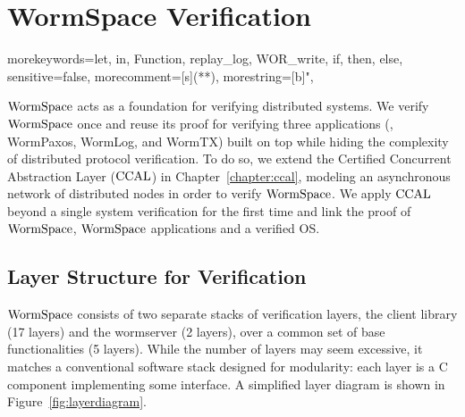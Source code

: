 \section{WormSpace Verification}
\label{sec:formal_verification}

{morekeywords={let, in, Function, replay_log, WOR_write, if, then, else},
sensitive=false,
morecomment=[s]{(*}{*)},
morestring=[b]",
}

$\mathrm{WormSpace}$ acts as a foundation for verifying distributed systems. 
We verify $\mathrm{WormSpace}$ once and reuse its proof for verifying three applications (\ie, WormPaxos, WormLog, and WormTX)
built on top while  hiding the complexity of distributed protocol verification. 	
To do so, we extend the Certified Concurrent Abstraction Layer ($\mathrm{CCAL}$)  in Chapter~\ref{chapter:ccal}, 
modeling an asynchronous network of distributed nodes in order to verify $\mathrm{WormSpace}$. 
We apply $\mathrm{CCAL}$ beyond a single system verification for the first time and link the proof of $\mathrm{WormSpace}$, 
$\mathrm{WormSpace}$ applications and a verified OS. 

\subsection{Layer Structure for Verification}

$\mathrm{WormSpace}$ consists of two separate stacks of verification layers, the client library (17 layers) and the wormserver (2 layers), over a common set of base functionalities (5 layers). While the number of layers may seem excessive, it matches a conventional software stack designed for modularity: each layer is a C component implementing some interface. A simplified layer diagram is shown in Figure~\ref{fig:layerdiagram}.


